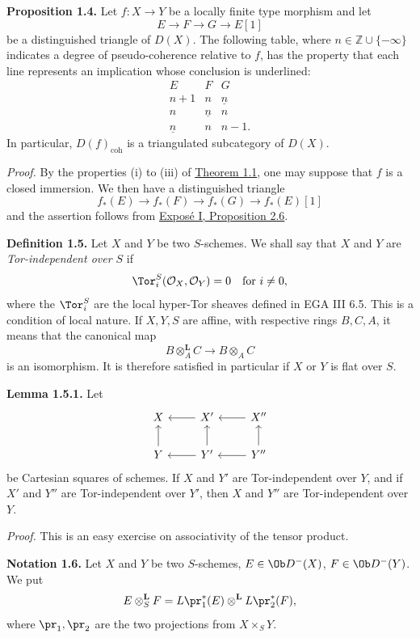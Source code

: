\textbf{Proposition 1.4.} Let \(f:X\to Y\) be a locally finite type morphism and let
\[
E\longrightarrow F\longrightarrow G\longrightarrow E[1]
\]
be a distinguished triangle of \(D(X)\). The following table, where \(n\in \mathbb Z\cup\{-\infty\}\) indicates a degree of pseudo-coherence relative to \(f\), has the property that each line represents an implication whose conclusion is underlined:
\[
\begin{array}{ccc}
E&F&G\\
n+1&n&\underline n\\
n&\underline n&n\\
\underline n&n&n-1.
\end{array}
\]
In particular, \(D(f)_{\mathrm{coh}}\) is a triangulated subcategory of \(D(X)\).

\emph{Proof.} By the properties (i) to (iii) of \hyperlink{sga6.e03.thm.1-1}{Theorem 1.1}, one may suppose that \(f\) is a closed immersion. We then have a distinguished triangle
\[
f_*(E)\longrightarrow f_*(F)\longrightarrow f_*(G)\longrightarrow f_*(E)[1]
\]
and the assertion follows from \hyperlink{sga6.e01.schol.2-6}{Exposé I, Proposition 2.6}.

\textbf{Definition 1.5.} Let \(X\) and \(Y\) be two \(S\)-schemes. We shall say that \(X\) and \(Y\) are \emph{Tor-independent over \(S\)} if
\[
  \Tor_i^S(\mathcal O_X,\mathcal O_Y)=0\quad\text{for }i\ne 0,
\]
where the \(\Tor_i^S\) are the local hyper-Tor sheaves defined in EGA III 6.5. This is a condition of local nature. If \(X,Y,S\) are affine, with respective rings \(B,C,A\), it means that the canonical map
\[
  B\otimes_A^{\mathbf L}C\longrightarrow B\otimes_A C
\]
is an isomorphism. It is therefore satisfied in particular if \(X\) or \(Y\) is flat over \(S\).

\textbf{Lemma 1.5.1.} Let
\[
\begin{tikzcd}
X & X' \arrow[l] & X'' \arrow[l]\\
Y \arrow[u] & Y' \arrow[l] \arrow[u] & Y'' \arrow[l] \arrow[u]
\end{tikzcd}
\]
be Cartesian squares of schemes. If \(X\) and \(Y'\) are Tor-independent over \(Y\), and if \(X'\) and \(Y''\) are Tor-independent over \(Y'\), then \(X\) and \(Y''\) are Tor-independent over \(Y\).

\emph{Proof.} This is an easy exercise on associativity of the tensor product.

\textbf{Notation 1.6.} Let \(X\) and \(Y\) be two \(S\)-schemes, \(E\in \Ob D^{-}(X)\), \(F\in \Ob D^{-}(Y)\). We put
\[
  E\otimes_S^{\mathbf L}F
  =
  L\pr_1^*(E)\otimes^{\mathbf L}L\pr_2^*(F),
\]
where \(\pr_1,\pr_2\) are the two projections from \(X\times_SY\).

